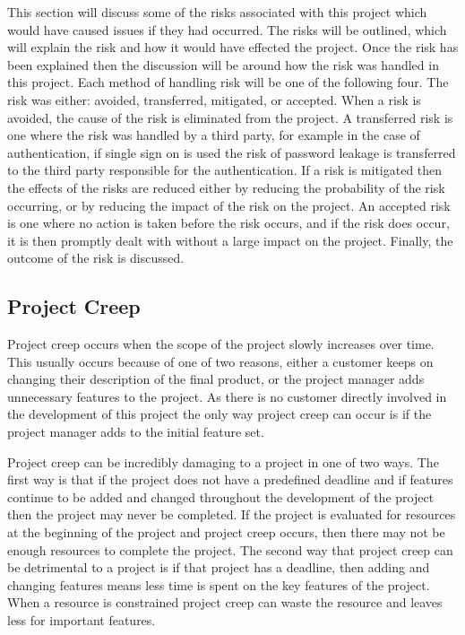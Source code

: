 \documentclass{article}
\begin{document}
This section will discuss some of the risks associated with this project which would have caused issues if they had occurred. The risks will be outlined, which will explain the risk and how it would have effected the project. Once the risk has been explained then the discussion will be around how the risk was handled in this project. Each method of handling risk will be one of the following four. The risk was either: avoided, transferred, mitigated, or accepted. When a risk is avoided, the cause of the risk is eliminated from the project. A transferred risk is one where the risk was handled by a third party, for example in the case of authentication, if single sign on is used the risk of password leakage is transferred to the third party responsible for the authentication. If a risk is mitigated then the effects of the risks are reduced either by reducing the probability of the risk occurring, or by reducing the impact of the risk on the project. An accepted risk is one where no action is taken before the risk occurs, and if the risk does occur, it is then promptly dealt with without a large impact on the project. Finally, the outcome of the risk is discussed. \par

\subsection{Project Creep}

Project creep occurs when the scope of the project slowly increases over time. This usually occurs because of one of two reasons, either a customer keeps on changing their description of the final product, or the project manager adds unnecessary features to the project. As there is no customer directly involved in the development of this project the only way project creep can occur is if the project manager adds to the initial feature set. \par

Project creep can be incredibly damaging to a project in one of two ways. The first way is that if the project does not have a predefined deadline and if features continue to be added and changed throughout the development of the project then the project may never be completed. If the project is evaluated for resources at the beginning of the project and project creep occurs, then there may not be enough resources to complete the project. The second way that project creep can be detrimental to a project is if that project has a deadline, then adding and changing features means less time is spent on the key features of the project. When a resource is constrained project creep can waste the resource and leaves less for important features. \par
\end{document}
